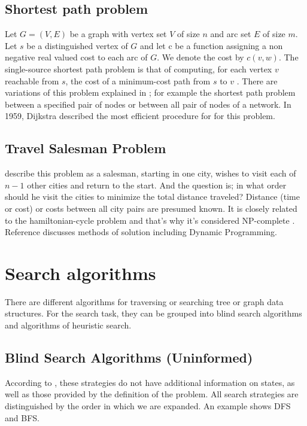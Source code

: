 \documentclass[11pt]{article}
\begin{document}
    \subsection{Shortest path problem}
    Let $G =  (V, E)$ be a graph with  vertex  set $V$ of size $n$ and arc set $E$ of size $m$. Let $s$ be a distinguished  vertex  of $G$ and let c be a function  assigning a non negative  real valued cost to each arc of $G$. We denote the cost by $c(v,w)$. The single-source shortest path problem is that  of computing, for each vertex  $v$ reachable from  $s$, the cost of a minimum-cost  path  from  $s$ to  $v$ \cite{ahuja1990faster}. 
    There are variations of this problem explained in \cite{dreyfus1969appraisal}; for example the shortest path problem between a specified pair of nodes or between all pair of nodes of a network. In 1959, Dijkstra \cite{dijkstra1959note} described the most efficient procedure for for this problem. 
    
    \subsection{Travel Salesman Problem}
    \cite{little1963algorithm} describe this problem as a salesman, starting in one city, wishes to visit each of $n-1$ other cities and return to the start. And the question is; in what order should he visit the cities to minimize the total distance traveled? Distance (time or cost) or costs between all city pairs are presumed known.
    It is closely related to the hamiltonian-cycle problem and that's why it's considered NP-complete \cite{cormen2009introduction}. Reference \cite{bellmore1968traveling} discusses methods of solution including Dynamic Programming.

\section{Search algorithms}
There are different algorithms for traversing or searching tree or graph data structures. For the search task, they can be grouped into blind search algorithms and algorithms of heuristic search.

    \subsection{Blind Search Algorithms (Uninformed)}
    According to \cite{russell2004inteligencia}, these strategies do not have additional information on states, as well as those provided by the definition of the problem. All search strategies are distinguished by the order in which we are expanded. An example shows DFS and BFS.
\end{document}
